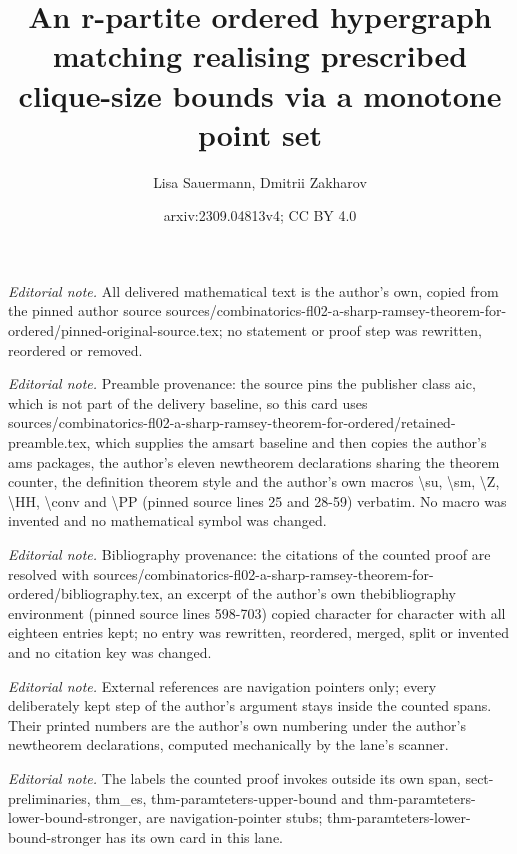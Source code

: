 \documentclass[10pt,a4paper]{amsart}
\title{An r-partite ordered hypergraph matching realising prescribed clique-size bounds via a monotone point set}
\author{Lisa Sauermann, Dmitrii Zakharov}
\date{arxiv:2309.04813v4; CC BY 4.0}
\theoremstyle{definition}
\begin{document}
\maketitle
\noindent\textit{Editorial note.} All delivered mathematical text is the author's own, copied from the pinned author source sources/combinatorics-fl02-a-sharp-ramsey-theorem-for-ordered/pinned-original-source.tex; no statement or proof step was rewritten, reordered or removed.\par\medskip
\noindent\textit{Editorial note.} Preamble provenance: the source pins the publisher class aic, which is not part of the delivery baseline, so this card uses sources/combinatorics-fl02-a-sharp-ramsey-theorem-for-ordered/retained-preamble.tex, which supplies the amsart baseline and then copies the author's ams packages, the author's eleven newtheorem declarations sharing the theorem counter, the definition theorem style and the author's own macros \textbackslash{}su, \textbackslash{}sm, \textbackslash{}Z, \textbackslash{}HH, \textbackslash{}conv and \textbackslash{}PP (pinned source lines 25 and 28-59) verbatim. No macro was invented and no mathematical symbol was changed.\par\medskip
\noindent\textit{Editorial note.} Bibliography provenance: the citations of the counted proof are resolved with sources/combinatorics-fl02-a-sharp-ramsey-theorem-for-ordered/bibliography.tex, an excerpt of the author's own thebibliography environment (pinned source lines 598-703) copied character for character with all eighteen entries kept; no entry was rewritten, reordered, merged, split or invented and no citation key was changed.\par\medskip
\noindent\textit{Editorial note.} External references are navigation pointers only; every deliberately kept step of the author's argument stays inside the counted spans. Their printed numbers are the author's own numbering under the author's newtheorem declarations, computed mechanically by the lane's scanner.\par\medskip
\noindent\textit{Editorial note.} The labels the counted proof invokes outside its own span, sect-preliminaries, thm\_es, thm-paramteters-upper-bound and thm-paramteters-lower-bound-stronger, are navigation-pointer stubs; thm-paramteters-lower-bound-stronger has its own card in this lane.\par\medskip
\end{document}
